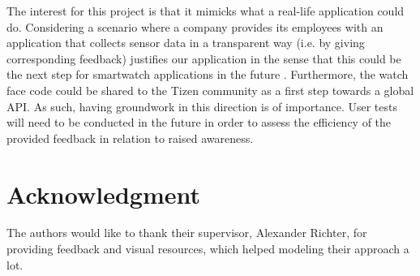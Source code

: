 \documentclass[conference, a4paper, 10pt, twocolumn]{IEEEtran}
\begin{document}
The interest for this project is that it mimicks what a real-life application could do. Considering a scenario where a company provides its employees with an application that collects sensor data in a transparent way (i.e. by giving corresponding feedback) justifies our application in the sense that this could be the next step for smartwatch applications in the future \cite{richter2020privacy}. Furthermore, the watch face code could be shared to the Tizen community as a first step towards a global \ac{API}. As such, having groundwork in this direction is of importance. User tests will need to be conducted in the future in order to assess the efficiency of the provided feedback in relation to raised awareness. 

\section*{\textbf{Acknowledgment}}
The authors would like to thank their supervisor, Alexander Richter, for providing feedback and visual resources, which helped modeling their approach a lot.

\printbibliography
\end{document}
